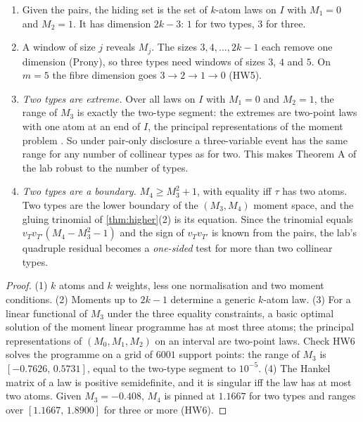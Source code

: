 \documentclass[11pt]{article}
\theoremstyle{definition}\newtheorem{definition}[theorem]{Definition}\newtheorem{remark}[theorem]{Remark}\newtheorem{example}[theorem]{Example}
\begin{document}
\begin{proposition}\label{prop:collinear}
\begin{enumerate}
\item[(1)] Given the pairs, the hiding set is the set of $k$-atom laws on $I$ with $M_1=0$ and $M_2=1$. It has dimension $2k-3$: $1$ for
  two types, $3$ for three.
\item[(2)] A window of size $j$ reveals $M_j$. The sizes $3,4,\dots,2k-1$ each remove one dimension (Prony), so three types need windows
  of sizes $3$, $4$ and $5$. On $m=5$ the fibre dimension goes $3\to2\to1\to0$ (HW5).
\item[(3)] \emph{Two types are extreme.} Over all laws on $I$ with $M_1=0$ and $M_2=1$, the range of $M_3$ is exactly the two-type
  segment: the extremes are two-point laws with one atom at an end of $I$, the principal representations of the moment problem
  \cite{KarlinStudden1966,KreinNudelman1977}. So under pair-only disclosure a three-variable event has the same range for any number of
  collinear types as for two. This makes Theorem A of the lab robust to the number of types.
\item[(4)] \emph{Two types are a boundary.} $M_4\ge M_3^2+1$, with equality iff $\tau$ has two atoms. Two types are the lower boundary of
  the $(M_3,M_4)$ moment space, and the gluing trinomial of \cref{thm:higher}(2) is its equation. Since the trinomial equals
  $v_Tv_{T'}(M_4-M_3^2-1)$ and the sign of $v_Tv_{T'}$ is known from the pairs, the lab's quadruple residual becomes a \emph{one-sided} test
  for more than two collinear types.
\end{enumerate}
\end{proposition}

\begin{proof}
(1) $k$ atoms and $k$ weights, less one normalisation and two moment conditions. (2) Moments up to $2k-1$ determine a generic $k$-atom law.
(3) For a linear functional of $M_3$ under the three equality constraints, a basic optimal solution of the moment linear programme has at most
three atoms; the principal representations of $(M_0,M_1,M_2)$ on an interval are two-point laws. Check HW6 solves the programme on a grid of
$6001$ support points: the range of $M_3$ is $[-0.7626,\,0.5731]$, equal to the two-type segment to $10^{-5}$. (4) The Hankel matrix
of a law is positive semidefinite, and it is singular iff the law has at most two atoms. Given $M_3=-0.408$, $M_4$ is pinned at
$1.1667$ for two types and ranges over $[1.1667,\,1.8900]$ for three or more (HW6).
\end{proof}
\end{document}
